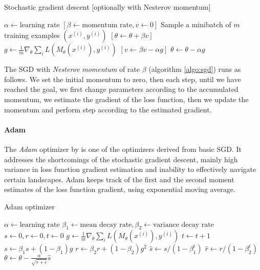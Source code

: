\begin{algorithm}
\label{algo:sgd}
\caption{Stochastic gradient descent [optionally with Nesterov momentum]}
\begin{algorithmic}
\STATE $\alpha \gets \text{learning rate}$
\STATE $[\beta \gets \text{momentum rate}, v \gets 0]$
\REPEAT
\STATE Sample a minibatch of $m$ training examples $(x^{(i)}, y^{(i)})$
\STATE $[\theta \gets \theta + \beta v]$
\STATE $g \gets \frac{1}{m} \nabla_\theta \sum_i L(M_\theta(x^{(i)}),y^{(i)})$
\STATE $[v \gets \beta v - \alpha g]$
\STATE $\theta \gets \theta - \alpha g$
\end{algorithmic}
\end{algorithm}

\noindent The SGD with \emph{Nesterov momentum} of rate $\beta$ (algorithm \ref{algo:sgd}) runs as follows. We set the initial momentum to zero, then each step, until we have reached the goal, we first change parameters according to the accumulated momentum, we estimate the gradient of the loss function, then we update the momentum and perform step according to the estimated gradient.

\paragraph{Adam}
\label{sec:adam}

The \emph{Adam} optimizer by \cite{DBLP:journals/corr/KingmaB14} is one of the optimizers derived from basic SGD. It addresses the shortcomings of the stochastic gradient descent, mainly high variance in loss function gradient estimation and inability to effectively navigate certain landscapes. Adam keeps track of the first and the second moment estimates of the loss function gradient, using exponential moving average.

\begin{algorithm}
\label{algo:adam}
\caption{Adam optimizer}
\begin{algorithmic}
\STATE $\alpha \gets \text{learning rate}$
\STATE $\beta_1 \gets \text{mean decay rate}, \beta_2 \gets \text{variance decay rate}$
\STATE $s \gets 0, r \gets 0, t \gets 0$
\REPEAT
\STATE $g \gets \frac{1}{m} \nabla_\theta \sum_i L(M_\theta(x^{(i)}),y^{(i)})$
\STATE $t \gets t + 1$
\STATE $s \gets \beta_1 s + (1 - \beta_1)g$
\STATE $r \gets \beta_2 r + (1 - \beta_2)g^2$
\STATE $\hat{s} \gets s / (1 - \beta_1^t)$
\STATE $\hat{r} \gets r / (1 - \beta_2^t)$
\STATE $\theta \gets \theta - \frac{\alpha}{\sqrt{\hat{r} + \epsilon}} \hat{s}$
\end{algorithmic}
\end{algorithm}

